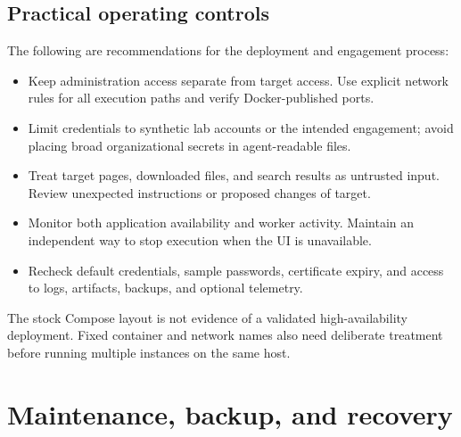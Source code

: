 \documentclass[11pt,letterpaper]{article}
\begin{document}
\subsection{Practical operating controls}
The following are recommendations for the deployment and engagement process:
\begin{itemize}
\item Keep administration access separate from target access. Use explicit
network rules for all execution paths and verify Docker-published ports.
\item Limit credentials to synthetic lab accounts or the intended engagement;
avoid placing broad organizational secrets in agent-readable files.
\item Treat target pages, downloaded files, and search results as untrusted
input. Review unexpected instructions or proposed changes of target.
\item Monitor both application availability and worker activity. Maintain an
independent way to stop execution when the UI is unavailable.
\item Recheck default credentials, sample passwords, certificate expiry, and
access to logs, artifacts, backups, and optional telemetry.
\end{itemize}
The stock Compose layout is not evidence of a validated high-availability
deployment. Fixed container and network names also need deliberate treatment
before running multiple instances on the same host.

\clearpage
\section{Maintenance, backup, and recovery}
\label{sec:operations}
\end{document}
